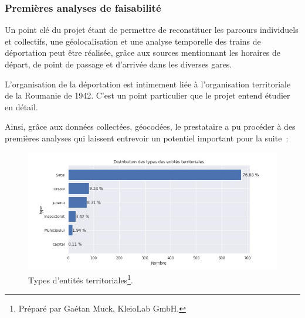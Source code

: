 \documentclass[a4paper,12pt,twoside]{book}
\begin{document}
				\subsubsection{Premières analyses de faisabilité}
				\label{parcours}
				    Un point clé du projet étant de permettre de reconstituer les parcours individuels et collectifs, une géolocalisation et une analyse temporelle des trains de déportation peut être réalisée, grâce aux sources mentionnant les horaires de départ, de point de passage et d'arrivée dans les diverses gares.
				    
				    L'organisation de la déportation est intimement liée à l'organisation territoriale de la Roumanie de 1942. C'est un point particulier que le projet entend étudier en détail.
				    
				    Ainsi, grâce aux données collectées, géocodées, le prestataire a pu procéder à des premières analyses qui laissent entrevoir un potentiel important pour la suite~:
				    
				    \begin{figure}[!ht]
            			\centering
                        \includegraphics[width=16cm]{images/entites_terr_distrib.jpg}
                        \vspace{-1cm}
                        \caption[Types d'entités territoriales.]{Types d'entités territoriales\footnote{Préparé par Gaétan Muck, KleioLab GmbH.}.}
                        \label{fig18}
                    \end{figure}
                    \pagebreak
                    
\end{document}
